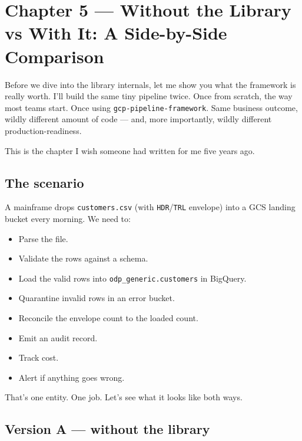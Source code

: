 \documentclass[
  11pt,
  british,
  oneside]{book}
\providecommand{\tightlist}{%
  \setlength{\itemsep}{0pt}\setlength{\parskip}{0pt}}
\begin{document}
\newpage

\hypertarget{chapter-5-without-the-library-vs-with-it-a-side-by-side-comparison}{%
\chapter{Chapter 5 --- Without the Library vs With It: A Side-by-Side
Comparison}\label{chapter-5-without-the-library-vs-with-it-a-side-by-side-comparison}}

Before we dive into the library internals, let me show you what the
framework is really worth. I'll build the same tiny pipeline twice. Once
from scratch, the way most teams start. Once using
\texttt{gcp-pipeline-framework}. Same business outcome, wildly different
amount of code --- and, more importantly, wildly different
production-readiness.

This is the chapter I wish someone had written for me five years ago.

\hypertarget{the-scenario}{%
\section{The scenario}\label{the-scenario}}

A mainframe drops \texttt{customers.csv} (with \texttt{HDR}/\texttt{TRL}
envelope) into a GCS landing bucket every morning. We need to:

\begin{itemize}
\tightlist
\item
  Parse the file.
\item
  Validate the rows against a schema.
\item
  Load the valid rows into \texttt{odp\_generic.customers} in BigQuery.
\item
  Quarantine invalid rows in an error bucket.
\item
  Reconcile the envelope count to the loaded count.
\item
  Emit an audit record.
\item
  Track cost.
\item
  Alert if anything goes wrong.
\end{itemize}

That's one entity. One job. Let's see what it looks like both ways.

\hypertarget{version-a-without-the-library}{%
\section{Version A --- without the
library}\label{version-a-without-the-library}}
\end{document}
